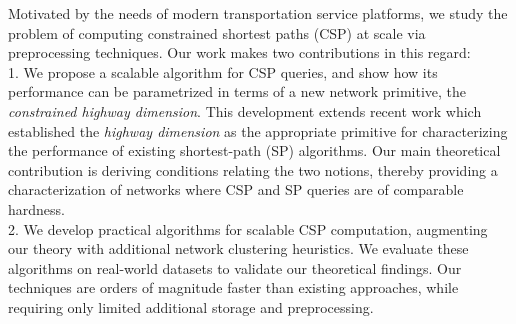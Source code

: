 Motivated by the needs of modern transportation service platforms, we study the problem of computing constrained shortest paths (CSP) at scale via preprocessing techniques.
Our work makes two contributions in this regard:\\
1. We propose a scalable algorithm for CSP queries, and show how its performance can be parametrized in terms of a new network primitive, the \emph{constrained highway dimension}. 
This development extends recent work which established the \emph{highway dimension} as the appropriate primitive for characterizing the performance of existing shortest-path (SP) algorithms. 
Our main theoretical contribution is deriving conditions relating the two notions, thereby providing a characterization of networks where CSP and SP queries are of comparable hardness.\\
2. We develop practical algorithms for scalable CSP computation, augmenting our theory with additional network clustering heuristics. 
We evaluate these algorithms on real-world datasets to validate our theoretical findings. 
Our techniques are orders of magnitude faster than existing approaches, while requiring only limited additional storage and preprocessing.